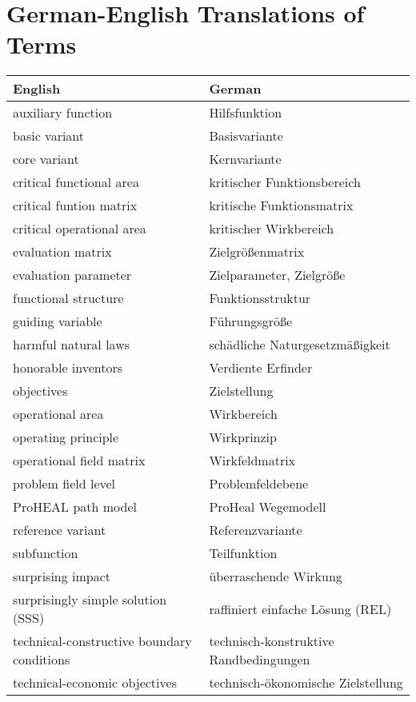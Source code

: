 \documentclass[11pt,a4paper]{article}
\begin{document}
\section{German-English Translations of Terms}
\begin{center}
  \begin{tabular}{l|l}
    English & German \\\hline
    auxiliary function & Hilfsfunktion \\
    basic variant & Basisvariante\\
    core variant & Kernvariante\\
    critical functional area & kritischer Funktionsbereich\\
    critical funtion matrix & kritische Funktionsmatrix\\
    critical operational area & kritischer Wirkbereich\\
    evaluation matrix& Zielgrößenmatrix \\
    evaluation parameter & Zielparameter, Zielgröße\\
    functional structure & Funktionsstruktur \\
    guiding variable & Führungsgröße \\
    harmful natural laws & schädliche Naturgesetzmäßigkeit\\
    honorable inventors & Verdiente Erfinder\\
    objectives & Zielstellung \\
    operational area & Wirkbereich\\
    operating principle & Wirkprinzip\\
    operational field matrix & Wirkfeldmatrix\\
    problem field level & Problemfeldebene \\
    ProHEAL path model & ProHeal Wegemodell\\
    reference variant & Referenzvariante\\
    subfunction & Teilfunktion\\
    surprising impact & überraschende Wirkung \\
    surprisingly simple solution (SSS) & raffiniert einfache Lösung (REL)\\
    technical-constructive boundary conditions & technisch-konstruktive
    Randbedingungen \\
    technical-economic objectives & technisch-ökonomische Zielstellung\\
  \end{tabular}
\end{center}
\end{document}
